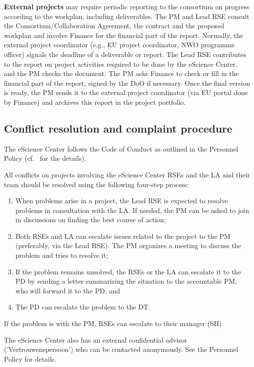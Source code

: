 \textbf{External projects} may require periodic reporting to the consortium on progress according to the workplan,
including deliverables. The PM and Lead RSE consult the Consortium/Collaboration Agreement, the contract and the
proposed workplan and involve Finance for the financial part of the report. Normally, the external project coordinator
(e.g., EU project coordinator, NWO programme officer) signals the deadline of a deliverable or report. The Lead RSE
contributes to the report on project activities required to be done by the eScience Center, and the PM checks the
document. The PM asks Finance to check or fill in the financial part of the report, signed by the DoO if necessary. Once
the final version is ready, the PM sends it to the external project coordinator (via EU portal done by Finance) and
archives this report in the project portfolio.

\subsection{Conflict resolution and complaint procedure}
The eScience Center follows the Code of Conduct as outlined in the Personnel Policy (cf.~\cite{cao} for the details).

All conflicts on projects involving the eScience Center RSEs and the LA and their team should be resolved using the
following four-step process:

\begin{enumerate}
\item When problems arise in a project, the Lead RSE is expected to resolve problems in consultation with the LA. If needed,
the PM can be asked to join in discussions on finding the best course of action;
\item Both RSEs and LA can escalate issues related to the project to the PM (preferably, via the Lead RSE). The PM organizes a
meeting to discuss the problem and tries to resolve it;
\item If the problem remains unsolved, the RSEs or the LA can escalate it to the PD by sending a letter summarizing the
situation to the accountable PM, who will forward it to the PD; and
\item The PD can escalate the problem to the DT.
\end{enumerate}

If the problem is with the PM, RSEs can escalate to their manager (SH).

The eScience Center also has an external confidential advisor ('Vertrouwenspersoon') who can be contacted anonymously. See the Personnel
Policy for details.

